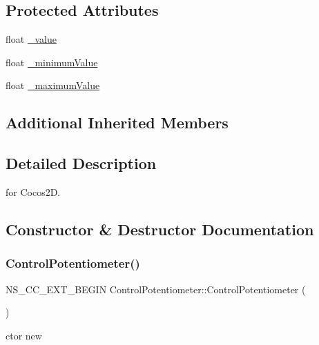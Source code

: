 \subsection*{Protected Attributes}
\begin{DoxyCompactItemize}
\item 
float \hyperlink{classControlPotentiometer_a774e4c02eccc1e070ad8cf2b7e86851c}{\+\_\+value}
\item 
float \hyperlink{classControlPotentiometer_a38f0851688e8848abc721ecbc3fcc8bf}{\+\_\+minimum\+Value}
\item 
float \hyperlink{classControlPotentiometer_a0553fb25f4666b1076a3e39133a7d193}{\+\_\+maximum\+Value}
\end{DoxyCompactItemize}
\subsection*{Additional Inherited Members}


\subsection{Detailed Description}
for Cocos2D. 

\subsection{Constructor \& Destructor Documentation}
\mbox{\label{classControlPotentiometer_a32c3e0a6d269d478e1ebad384f033dc9}} 
\subsubsection{\texorpdfstring{Control\+Potentiometer()}{ControlPotentiometer()}\hspace{0.1cm}{\footnotesize\ttfamily [1/2]}}
{\footnotesize\ttfamily N\+S\+\_\+\+C\+C\+\_\+\+E\+X\+T\+\_\+\+B\+E\+G\+IN Control\+Potentiometer\+::\+Control\+Potentiometer (\begin{DoxyParamCaption}{ }\end{DoxyParamCaption})}

ctor  new \mbox{\label{classControlPotentiometer_a154a0d88aeed45da5da4a008fe0f3c15}} 
